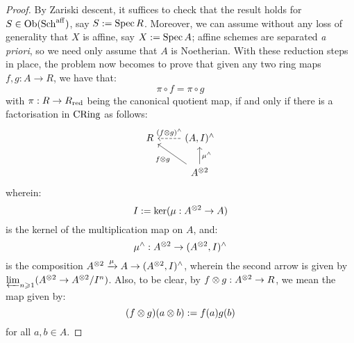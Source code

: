                 \begin{proof}
                    By Zariski descent, it suffices to check that the result holds for $S \in \mathrm{Ob}(\mathrm{Sch}^{\mathrm{aff}})$, say $S := \operatorname{Spec} R$. Moreover, we can assume without any loss of generality that $X$ is affine, say $X := \operatorname{Spec} A$; affine schemes are separated \textit{a priori}, so we need only assume that $A$ is Noetherian. With these reduction steps in place, the problem now becomes to prove that given any two ring maps $f, g: A \to R$, we have that:
                        $$\pi \circ f = \pi \circ g$$
                    with $\pi: R \to R_{\mathrm{red}}$ being the canonical quotient map, if and only if there is a factorisation in $\mathrm{CRing}$ as follows:
                        \begin{equation} \label{diagram: formal_neighbourhood_of_diagonal_algebraic}
                            \begin{tikzcd}
                        	R & {(A, I)^{\wedge}} \\
                        	& {A^{\tensor 2}}
                        	\arrow["{(f \tensor g)^{\wedge}}"', dashed, from=1-2, to=1-1]
                        	\arrow["{f \tensor g}", from=2-2, to=1-1]
                        	\arrow["{\mu^{\wedge}}"', from=2-2, to=1-2]
                            \end{tikzcd}
                        \end{equation}
                    wherein:
                        $$I := \ker(\mu: A^{\tensor 2} \to A)$$
                    is the kernel of the multiplication map on $A$, and:
                        $$\mu^{\wedge}: A^{\tensor 2} \to (A^{\tensor 2}, I)^{\wedge}$$
                    is the composition $A^{\tensor 2} \xrightarrow[]{\mu} A \to (A^{\tensor 2}, I)^{\wedge}$, wherein the second arrow is given by $\projlim_{n \geq 1} (A^{\tensor 2} \to A^{\tensor 2}/I^n)$. Also, to be clear, by $f \tensor g: A^{\tensor 2} \to R$, we mean the map given by:
                        $$(f \tensor g)(a \tensor b) := f(a) g(b)$$
                    for all $a, b \in A$.


\end{proof}
